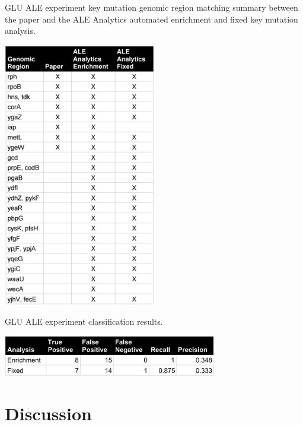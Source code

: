 \documentclass[12pt,final,masters,chapterheads]{ucsd}  %
\begin{document}
\begin{table}[H]
  \caption{GLU ALE experiment {key mutation} genomic region matching summary between the paper and the ALE Analytics automated enrichment and fixed key mutation analysis.}
  \centering
  \includegraphics[width=0.5\textwidth]{glu_key_mutation_regions.png}
\end{table}
\begin{table}[H]
  \centering
   \caption{GLU ALE experiment classification results.}
  \includegraphics[width=0.7\textwidth]{glu_precision_recall.png}
\end{table}

\chapter{Discussion}
%
%
%
%
%
%
%
%
\end{document}
